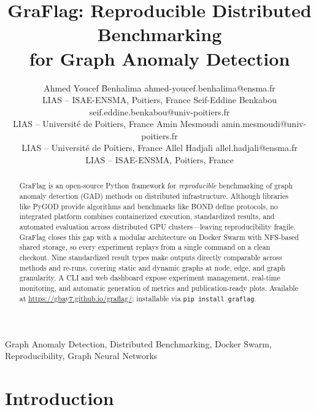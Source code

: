 \documentclass[twoside,11pt]{article}
\begin{document}
\title{GraFlag: Reproducible Distributed Benchmarking\\for Graph Anomaly Detection}

\author{\name Ahmed Youcef Benhalima \email ahmed-youcef.benhalima@ensma.fr \\
       \addr LIAS -- ISAE-ENSMA, Poitiers, France
       \AND
       \name Seif-Eddine Benkabou \email seif.eddine.benkabou@univ-poitiers.fr \\
       \addr LIAS -- Universit\'{e} de Poitiers, France
       \AND
       \name Amin Mesmoudi \email amin.mesmoudi@univ-poitiers.fr \\
       \addr LIAS -- Universit\'{e} de Poitiers, France
       \AND
       \name Allel Hadjali \email allel.hadjali@ensma.fr \\
       \addr LIAS -- ISAE-ENSMA, Poitiers, France}


\maketitle

\begin{abstract}%
GraFlag is an open-source Python framework for \emph{reproducible} benchmarking of graph anomaly detection (GAD) methods on distributed infrastructure. Although libraries like PyGOD provide algorithms and benchmarks like BOND define protocols, no integrated platform combines containerized execution, standardized results, and automated evaluation across distributed GPU clusters---leaving reproducibility fragile. GraFlag closes this gap with a modular architecture on Docker Swarm with NFS-based shared storage, so every experiment replays from a single command on a clean checkout. Nine standardized result types make outputs directly comparable across methods and re-runs, covering static and dynamic graphs at node, edge, and graph granularity. A CLI and web dashboard expose experiment management, real-time monitoring, and automatic generation of metrics and publication-ready plots. Available at \url{https://gbay7.github.io/graflag/}; installable via \texttt{pip install graflag}.
\end{abstract}

\begin{keywords}
  Graph Anomaly Detection, Distributed Benchmarking, Docker Swarm, Reproducibility, Graph Neural Networks
\end{keywords}

\section{Introduction}
\end{document}
